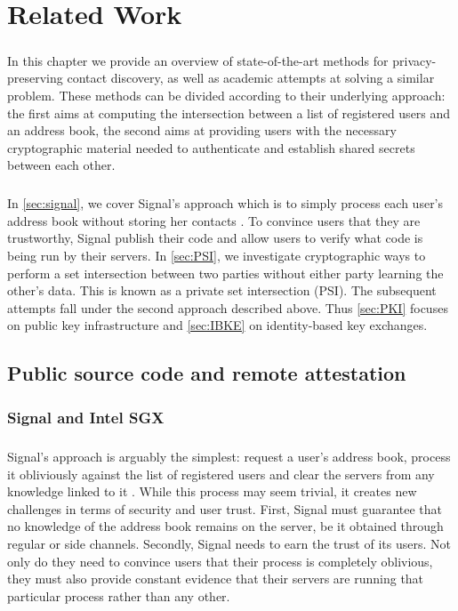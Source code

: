 \chapter{Related Work}
\label{chap:litreview}

\paragraph{} In this chapter we provide an overview of state-of-the-art methods for privacy-preserving contact discovery, as well as academic attempts at solving a similar problem. These methods can be divided according to their underlying approach: the first aims at computing the intersection between a list of registered users and an address book, the second aims at providing users with the necessary cryptographic material needed to authenticate and establish shared secrets between each other.


\paragraph{} In \autoref{sec:signal}, we cover Signal's approach which is to simply process each user's address book without storing her contacts \cite{Signal:Tech}. To convince users that they are trustworthy, Signal publish their code and allow users to verify what code is being run by their servers. In \autoref{sec:PSI}, we investigate cryptographic ways to perform a set intersection between two parties without either party learning the other's data. This is known as a private set intersection (PSI). The subsequent attempts fall under the second approach described above. Thus \autoref{sec:PKI} focuses on public key infrastructure and \autoref{sec:IBKE} on identity-based key exchanges.

\section{Public source code and remote attestation}
\label{sec:signal}

\subsection{Signal and Intel SGX}

\paragraph{} Signal's approach is arguably the simplest: request a user's address book, process it obliviously against the list of registered users and clear the servers from any knowledge linked to it \cite{Signal:Tech}. While this process may seem trivial, it creates new challenges in terms of security and user trust. First, Signal must guarantee that no knowledge of the address book remains on the server, be it obtained through regular or side channels. Secondly, Signal needs to earn the trust of its users. Not only do they need to convince users that their process is completely oblivious, they must also provide constant evidence that their servers are running that particular process rather than any other.

